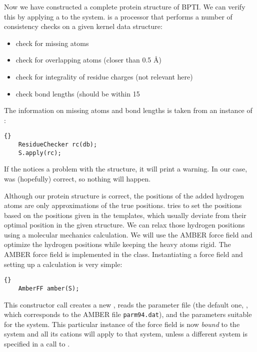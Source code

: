 \noindent
Now we have constructed a complete protein structure of BPTI. We can verify
this by applying a  to the system.
 is a processor that performs a number of consistency
checks on a given kernel data structure:
\begin{itemize}
	\item check for missing atoms
	\item check for overlapping atoms (closer than 0.5 \AA)
	\item check for integrality of residue charges (not relevant here)
	\item check bond lengths (should be within 15%
\end{itemize}
The information on missing atoms and bond lengths is taken from an instance
of :

\begin{lstlisting}{}
	ResidueChecker rc(db);
	S.apply(rc);
\end{lstlisting}
	
\noindent
If the  notices a problem with the structure, it will 
print a warning. In our case, was (hopefully) correct, so nothing will happen.

Although our protein structure is correct, the positions of the added hydrogen
atoms are only approximations of the true positions.
 tries to set the positions based on the
positions given in the  templates, which usually deviate
from their optimal position in the given structure. We can relax those
hydrogen positions using a molecular mechanics calculation.
We will use the AMBER force field\cite{AMBER95} and optimize the hydrogen 
positions while keeping the heavy atoms rigid. The AMBER force field is
implemented in the  class. Instantiating a force field and
setting up a calculation is very simple:

\begin{lstlisting}{}
	AmberFF amber(S);
\end{lstlisting}

\noindent
This constructor call creates a new , reads the parameter
file (the default one, , which corresponds to the AMBER
file {\tt parm94.dat}), and the parameters suitable for the system.
This particular instance of the force field is now {\em bound} to the 
system and all its cations will apply to that system, unless a different
system is specified in a call to .

